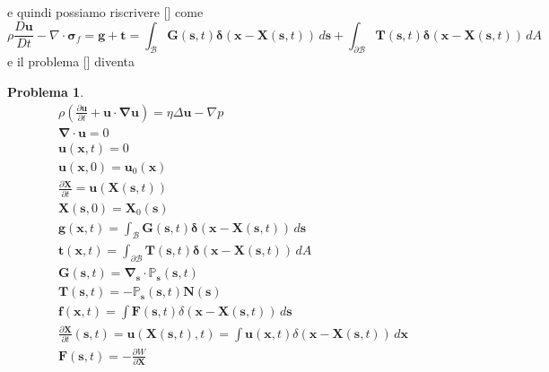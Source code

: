 \documentclass{book}
\newtheorem{problem}[theorem]{Problema}
\newcommand{\bsigma}{\boldsymbol{\sigma}}
\newcommand{\Nabla}{\boldsymbol{\nabla}}
\begin{document}
e quindi possiamo riscrivere [] come
\begin{equation}
\rho\frac{D\mathbf{u}}{Dt}-\nabla\cdot\bsigma_f = \mathbf{g}+\mathbf{t} = \int_{\mathcal{B}}\mathbf{G}(\mathbf{s},t)\boldsymbol{\delta}(\mathbf{x}-\mathbf{X}(\mathbf{s},t))\,d\mathbf{s}+
\int_{\partial \mathcal{B}}\mathbf{T}(\mathbf{s},t)\boldsymbol{\delta}(\mathbf{x}-\mathbf{X}(\mathbf{s},t))\,dA
\end{equation}
e il problema [] diventa
\begin{problem}
	\begin{equation}
\begin{aligned}
	\rho \left ( \frac{\partial \mathbf{u}}{\partial t} + \mathbf{u} \cdot \Nabla \mathbf{u} \right ) = \eta \Delta \mathbf{u} - \nabla p \\
	\Nabla \cdot \mathbf{u} = 0 \\
	\mathbf{u}(\mathbf{x},t)=0 \\
	\mathbf{u}(\mathbf{x},0)=\mathbf{u}_0(\mathbf{x}) \\
	\frac{\partial \mathbf{X}}{\partial t} = \mathbf{u}(\mathbf{X}(\mathbf{s},t))\\
	\mathbf{X}(\mathbf{s},0)=\mathbf{X}_0(\mathbf{s})\\
		\mathbf{g}(\mathbf{x},t)=\int_{\mathcal{B}}\mathbf{G}(\mathbf{s},t)\boldsymbol{\delta}(\mathbf{x}-\mathbf{X}(\mathbf{s},t))\,d\mathbf{s}\\
	\mathbf{t}(\mathbf{x},t)=\int_{\partial \mathcal{B}}\mathbf{T}(\mathbf{s},t)\boldsymbol{\delta}(\mathbf{x}-\mathbf{X}(\mathbf{s},t))\,dA\\
		\mathbf{G}(\mathbf{s},t)=\Nabla_{\mathbf{s}}\cdot\mathbb{P}_{\mathbf{s}}(\mathbf{s},t)\\
			\mathbf{T}(\mathbf{s},t)=-\mathbb{P}_{\mathbf{s}}(\mathbf{s},t)\mathbf{N}(\mathbf{s})\\
	\mathbf{f}(\mathbf{x},t)=\int \mathbf{F}(\mathbf{s},t)\delta(\mathbf{x}-\mathbf{X}(\mathbf{s},t))\,d\mathbf{s}\\
	\frac{\partial\mathbf{X}}{\partial t}(\mathbf{s},t)=\mathbf{u}(\mathbf{X}(\mathbf{s},t),t)=\int \mathbf{u}(\mathbf{x},t)\delta(\mathbf{x}-\mathbf{X}(\mathbf{s},t))\,d\mathbf{x}\\
	\mathbf{F}(\mathbf{s},t)=-\frac{\partial W}{\partial \mathbf{X}}\\
\end{aligned}
\end{equation}
\end{problem}
\end{document}
